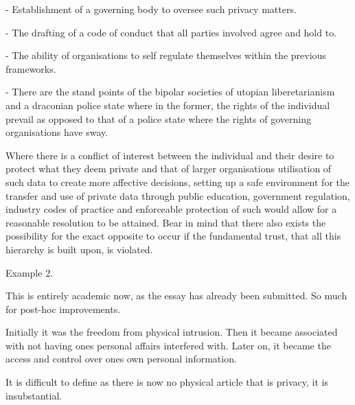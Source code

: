 
\item - Establishment of a governing body to oversee such privacy matters.
\item - The drafting of a code of conduct that all parties involved agree and hold to.
\item - The ability of organisations to self regulate themselves within the previous frameworks.
\item - There are the stand points of the bipolar societies of utopian liberetarianism and a draconian police state where in the former, the rights of the individual prevail as opposed to that of a police state where the rights of governing organisations have sway.


Where there is a conflict of interest between the individual and their desire to protect what they deem private and that of larger organisations utilisation of such data to create more affective decisions, setting up a safe environment for the transfer and use of private data through public education, government regulation, industry codes of practice and enforceable protection of such would allow for a reasonable resolution to be attained. Bear in mind that there also exists the possibility for the exact opposite to occur if the fundamental trust, that all this hierarchy is built upon, is violated. 



Example 2.


This is entirely academic now, as the essay has already been submitted. So much for post-hoc improvements.



Initially it was the freedom from physical intrusion. Then it became associated with not having ones personal affairs interfered with. Later on, it became the access and control over ones own personal information.

It is difficult to define as there is now no physical article that is privacy, it is insubstantial.

